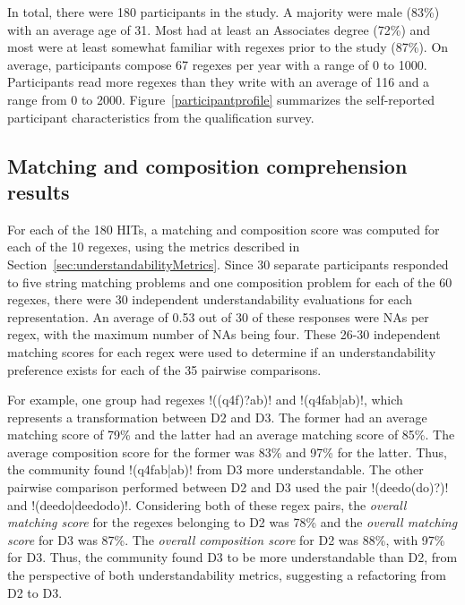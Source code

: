 In total, there were 180 participants in the study.
A majority were male (83\%) with an average age of 31. Most had
at least an Associates degree (72\%) and most were at least somewhat familiar with regexes prior to the study (87\%). On average,
participants compose 67 regexes per year with a range of 0 to 1000.
Participants read more regexes than they write with an average of 116 and a range from 0 to 2000.
Figure~\ref{participantprofile} summarizes the self-reported participant characteristics from the qualification survey.

\subsection{Matching and composition comprehension results}
\label{sec:comprehensionResults}



For each of the 180 HITs, a matching and composition score was computed for each of the 10 regexes, using the metrics described in Section~\ref{sec:understandabilityMetrics}.  Since 30 separate participants responded to five string matching problems and one composition problem for each of the 60 regexes, there were 30 independent understandability evaluations for each representation.  An average of 0.53 out of 30 of these responses were NAs per regex, with the maximum number of NAs being four.  These 26-30 independent matching scores for each regex were used to determine if an understandability preference exists for each of the 35 pairwise comparisons.

For example, one group had regexes \cverb!((q4f)?ab)! and \cverb!(q4fab|ab)!, which  represents a transformation between D2 and D3. The former had an average matching score of 79\% and the latter had an average matching score of 85\%. The average composition score for the former was 83\% and 97\% for the latter. Thus, the community found \cverb!(q4fab|ab)! from D3 more understandable.
The other pairwise comparison performed between D2 and D3 used the pair \cverb!(deedo(do)?)! and \cverb!(deedo|deedodo)!.
Considering both of these regex pairs, the \emph{overall matching score} for the regexes belonging to D2 was 78\% and the \emph{overall matching score} for D3 was 87\%.
The \emph{overall composition score} for D2 was 88\%, with 97\% for D3. Thus, the community found D3 to be more understandable than D2, from the perspective of both understandability metrics, suggesting a refactoring from D2 to D3.

